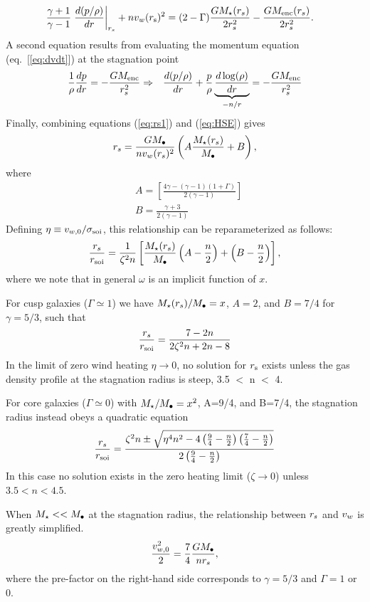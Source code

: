 \begin{align}
&\frac{\gamma+1}{\gamma-1}
\left.\frac{d (p/\rho)}{d r}\right|_{r_s}+ n v_{w}(r_{\rm s})^{2} = (2-\Gamma) \frac{G
  M_{\star}(r_s)}{2 r_s^2} -\frac{G M_{\rm enc}(r_s)}{2 r_s^2}.  \label{eq:rs1}
\end{align}
A second equation results from evaluating the momentum equation (eq.~[\ref{eq:dvdt}]) at the stagnation point
\begin{align}
&\frac{1}{\rho}\frac{d p}{d r}=- \frac{GM_{\rm enc}}{r_s^2} \Rightarrow
&\frac{d (p/\rho)}{d r}+\frac{p}{\rho}
\underbrace{\frac{d\log(\rho)}{dr}}_{-n/r} = -\frac{G M_{\rm enc}}{r_s^2} \label{eq:HSE}
\end{align}
Finally, combining equations (\ref{eq:rs1}) and (\ref{eq:HSE}) gives 
\begin{align}
r_s=\frac{G M_{\bullet}}{n v_w(r_s)^2}\left(A \frac{M_{\star}(r_s)}{M_{\bullet}} +B\right),
\end{align}
where
\begin{align}
&A=\left[\frac{4\gamma-(\gamma-1)(1+\Gamma)}{2 (\gamma-1)}\right]\\
&B=\frac{\gamma+3}{2 (\gamma-1)}
\end{align}
Defining $\eta \equiv v_{w,0}/\sigma_{\rm soi}$, this relationship can be reparameterized as follows:
\begin{align}
  \frac{r_s}{r_{\rm soi}}=\frac{1}{\zeta^2 n}\left[
   \frac{M_{\star}(r_s)}{M_{\bullet}}\left(A-\frac{n}{2}\right)+\left(B-\frac{n}{2}\right)\right],
\end{align}
where we note that in general $\omega$ is an implicit function of $x$. 

For cusp galaxies ($\Gamma\simeq1$) we have $M_{\star}(r_s)/M_{\bullet}=x$, $A=2$, and $B=7/4$ for $\gamma = 5/3$, such that 
\begin{align}
\frac{r_s}{r_{\rm soi}}=\frac{7-2n}{2\zeta^2 n+2n-8}
\end{align}
In the limit of zero wind heating $\eta \rightarrow 0$, no solution for $r_{\rm s}$ exists unless the gas density profile at the stagnation radius is steep, 3.5 $<$ n $<$ 4.  

For core galaxies ($\Gamma \simeq 0$) with $M_{\star}/M_{\bullet}=x^2$, A=9/4, and B=7/4, the stagnation radius instead obeys a quadratic equation
\begin{align}
\frac{r_s}{r_{\rm soi}}=\frac{\zeta^2 n \pm \sqrt{\eta^4 n^2 -4 \left(\frac{9}{4}-\frac{n}{2}\right) \left(\frac{7}{4}-\frac{n}{2}\right)}}{2\left(\frac{9}{4}-\frac{n}{2}\right)}
\label{eq:rstag}
\end{align}
In this case no solution exists in the zero heating limit ($\zeta \rightarrow 0$) unless $3.5<n<4.5$.

When $M_{\star} << M_{\bullet}$ at the stagnation radius, the relationship between $r_s$ and $v_w$ is greatly simplified. 
\begin{align}
\frac{v_{w,0}^2}{2}=\frac{7}{4}\frac{G M_{\bullet}}{n r_s},
\end{align}
where the pre-factor on the right-hand side corresponds to $\gamma=5/3$ and $\Gamma=1$ or 0.  


